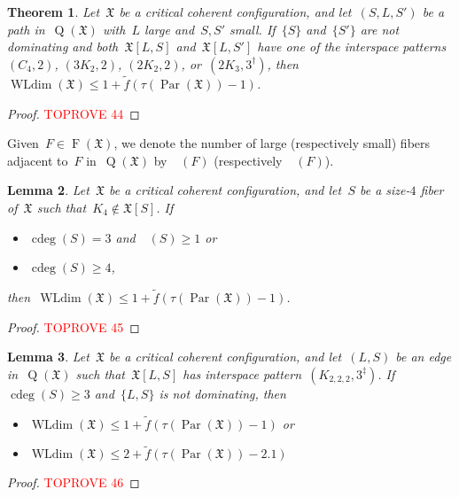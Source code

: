 \documentclass[english,a4paper]{article}
\theoremstyle{plain}
\newtheorem{theorem}             {Theorem}[section]
\newtheorem{lemma}      [theorem]{Lemma}
\theoremstyle{definition}
\DeclareMathOperator{\Fibers}{F}
\newcommand{\coherentConfig}{\ensuremath{\mathfrak{X}}}
\newcommand{\fibers}[1]{\ensuremath{\Fibers \left( #1 \right)}}
\newcommand{\interspace}[2]{\ensuremath{\coherentConfig[#1,#2]}}
\newcommand{\inducedCC}[1]{\ensuremath{\coherentConfig[#1]}}
\DeclareMathOperator*{\WLdim}{WLdim}
\newcommand{\wldim}[1]{\ensuremath{\WLdim\left(#1\right)}}
\DeclareMathOperator*{\Quotient}{Q}
\newcommand{\quotientGraph}[1]{\ensuremath{\Quotient(#1)}}
\DeclareMathOperator{\ColorDeg}{cdeg}
\DeclareMathOperator{\ColorDegLarge}{cdeg_L}
\DeclareMathOperator{\ColorDegSmall}{cdeg_S}
\newcommand{\colorDeg}[1]{\ensuremath{\ColorDeg\left(#1\right)}}
\newcommand{\colorDegLarge}[1]{\ensuremath{\ColorDegLarge\left(#1\right)}}
\newcommand{\colorDegSmall}[1]{\ensuremath{\ColorDegSmall\left(#1\right)}}
\newcommand{\f}{f}
\DeclareMathOperator{\parameters}{Par}
\newcommand{\ipfourMatching}{\ensuremath{(\disjointCliques{2}{2},2)}}
\newcommand{\ipfourCycle}   {\ensuremath{(\cycle{4},2)}}
\newcommand{\ipsixMatching}             {\ensuremath{(\disjointCliques{3}{2},2)}}
\newcommand{\ipsixTriangle}               {\ensuremath{(\disjointCliques{2}{3},3^\dag)}}
\newcommand{\ipsixMatchingComplementD}{\ensuremath{(\clique{2,2,2},3^\ddag)}}
\newcommand{\clique}[1]{\ensuremath{K_{#1}}}
\newcommand{\cycle}[1]{\ensuremath{C_{#1}}}
\newcommand{\disjointCliques}[2]{\ensuremath{#1 \clique{#2}}}
\begin{document}
\begin{theorem}
\label{local:S-L-S:rest/thm}
    Let~$\coherentConfig$ be a critical coherent configuration, and let~$(S,L,S')$ be a path in~$\quotientGraph{\coherentConfig}$ with~$L$ large and~$S,S'$ small.
    If~$\{S\}$ and~$\{S'\}$ are not dominating and both~$\interspace{L}{S}$ and~$\interspace{L}{S'}$ have one of the interspace patterns~$\ipfourCycle$, $\ipsixMatching$, $\ipfourMatching$, or~$\ipsixTriangle$,
    then~$\wldim{\coherentConfig} \leq 1 + \widetilde{\f}( \tau(\parameters(\coherentConfig)) - 1)$.
\end{theorem}
\begin{proof}\textcolor{red}{TOPROVE 44}\end{proof}










Given~$F \in \fibers{\coherentConfig}$, we denote the number of large (respectively small) fibers adjacent to~$F$ in~$\quotientGraph{\coherentConfig}$ by~$\colorDegLarge{F}$ (respectively~$\colorDegSmall{F}$).

\begin{lemma}
\label{local:4cc:3neighbors/lem}
    Let~$\coherentConfig$ be a critical coherent configuration, and let~$S$ be a size-$4$ fiber of~$\coherentConfig$ such that~$\clique{4} \notin\inducedCC{S}$.
    If~
    \begin{itemize}
        \item $\colorDeg{S} = 3$ and~$\colorDegLarge{S} \geq 1$ or
        \item $\colorDeg{S} \geq 4$,
    \end{itemize}
    then~$\wldim{\coherentConfig} \leq 1 + \widetilde{\f}( \tau(\parameters(\coherentConfig)) - 1)$.
\end{lemma}
\begin{proof}\textcolor{red}{TOPROVE 45}\end{proof}










\begin{lemma}
\label{local:K222-3D/lem}
    Let~$\coherentConfig$ be a critical coherent configuration, and let~$(L,S)$ be an edge in~$\quotientGraph{\coherentConfig}$ such that~$\interspace{L}{S}$ has interspace pattern~$\ipsixMatchingComplementD$.
    If~$\colorDeg{S} \geq 3$ and~$\{L,S\}$ is not dominating, then
    \begin{itemize}
        \item $\wldim{\coherentConfig} \leq 1 + \widetilde{\f}( \tau(\parameters(\coherentConfig)) - 1)$ or
        \item $\wldim{\coherentConfig} \leq 2 + \widetilde{\f}( \tau(\parameters(\coherentConfig)) - 2.1)$
    \end{itemize}
\end{lemma}
\begin{proof}\textcolor{red}{TOPROVE 46}\end{proof}
\end{document}
